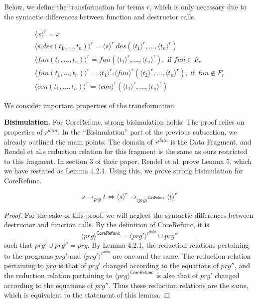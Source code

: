 \begin{algorithm}
Below, we define the transformation for terms $r$, which is only necessary due to the syntactic differences between function and destructor calls.

\begin{align*}
\langle x \rangle^r = x \\
\langle s.des(t_1, ..., t_n) \rangle^r = \langle s \rangle^r .des(\langle t_1 \rangle^r, ..., \langle t_n \rangle^r) \\
\langle fun(t_1, ..., t_n) \rangle^r = fun(\langle t_1 \rangle^r, ..., \langle t_n \rangle^r), \text{ if } fun \in F_r \\
\langle fun(t_1, ..., t_n) \rangle^r = \langle t_1 \rangle^r .\langle fun \rangle^r (\langle t_2 \rangle^r, ..., \langle t_n \rangle^r), \text{ if } fun \not\in F_r \\
\langle con(t_1, ..., t_n) \rangle^r = \langle con \rangle^r (\langle t_1 \rangle^r, ..., \langle t_n \rangle^r)
\end{align*}

\end{algorithm}

We consider important properties of the transformation.

\textbf{Bisimulation.} For \textsf{CoreRefunc}, strong bisimulation holds. The proof relies on properties of $r^{data}$. In the ``Bisimulation'' part of the previous subsection, we already outlined the main points: The domain of $r^{data}$ is the Data Fragment, and Rendel et al.s reduction relation for this fragment is the same as ours restricted to this fragment. In section 3 of their paper, Rendel et al. prove Lemma 5, which we have restated as Lemma 4.2.1. Using this, we prove strong bisimulation for \textsf{CoreRefunc}.

\begin{lemma}
\[
s \longrightarrow_{prg} t \iff \langle s \rangle^r \longrightarrow_{\langle prg \rangle^{\textsf{CoreRefunc}}} \langle t \rangle^r
\]

\begin{proof}
For the sake of this proof, we will neglect the syntactic differences between destructor and function calls. By the definition of \textsf{CoreRefunc}, it is
\[
\langle prg \rangle^{\textsf{CoreRefunc}} = \langle prg' \rangle^{r^{data}} \cup prg''
\]
such that $prg' \cup prg'' = prg$. By Lemma 4.2.1, the reduction relations pertaining to the programs $prg'$ and $\langle prg' \rangle^{r^{data}}$ are one and the same. The reduction relation pertaining to $prg$ is that of $prg'$ changed according to the equations of $prg''$, and the reduction relation pertaining to $\langle prg \rangle^{\textsf{CoreRefunc}}$ is also that of $prg'$ changed according to the equations of $prg''$. Thus these reduction relations are the same, which is equivalent to the statement of this lemma.
\end{proof}
\end{lemma}

